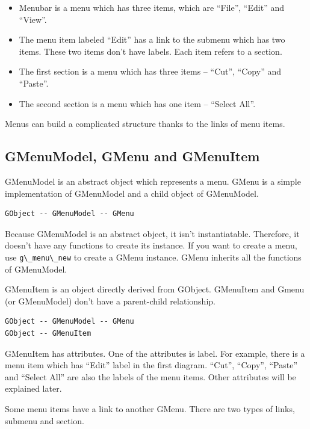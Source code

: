 \begin{itemize}
\tightlist
\item
  Menubar is a menu which has three items, which are ``File'', ``Edit''
  and ``View''.
\item
  The menu item labeled ``Edit'' has a link to the submenu which has two
  items. These two items don't have labels. Each item refers to a
  section.
\item
  The first section is a menu which has three items -- ``Cut'', ``Copy''
  and ``Paste''.
\item
  The second section is a menu which has one item -- ``Select All''.
\end{itemize}

Menus can build a complicated structure thanks to the links of menu
items.

\subsection{GMenuModel, GMenu and
GMenuItem}\label{gmenumodel-gmenu-and-gmenuitem}

GMenuModel is an abstract object which represents a menu. GMenu is a
simple implementation of GMenuModel and a child object of GMenuModel.

\begin{lstlisting}
GObject -- GMenuModel -- GMenu
\end{lstlisting}

Because GMenuModel is an abstract object, it isn't instantiatable.
Therefore, it doesn't have any functions to create its instance. If you
want to create a menu, use \passthrough{\lstinline!g\_menu\_new!} to
create a GMenu instance. GMenu inherits all the functions of GMenuModel.

GMenuItem is an object directly derived from GObject. GMenuItem and
Gmenu (or GMenuModel) don't have a parent-child relationship.

\begin{lstlisting}
GObject -- GMenuModel -- GMenu
GObject -- GMenuItem
\end{lstlisting}

GMenuItem has attributes. One of the attributes is label. For example,
there is a menu item which has ``Edit'' label in the first diagram.
``Cut'', ``Copy'', ``Paste'' and ``Select All'' are also the labels of
the menu items. Other attributes will be explained later.

Some menu items have a link to another GMenu. There are two types of
links, submenu and section.

